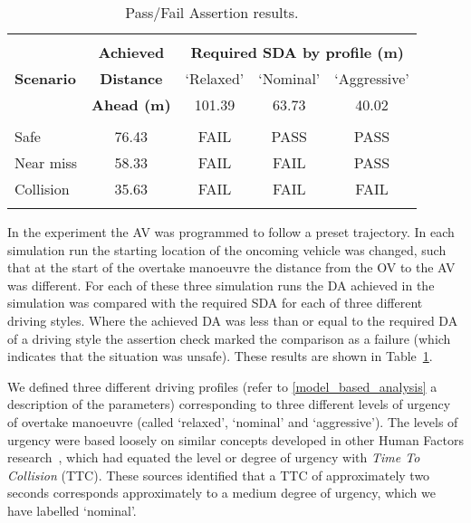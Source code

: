 \begin{table}[t]
\centering
\begin{tabular}{lcccc}
\hline
\\
\multirow{3}{*}{\textbf{Scenario}} & \textbf{Achieved} & \multicolumn{3}{c}{
\textbf{Required SDA by profile (m)}}\\ %
& \textbf{Distance} & `Relaxed' & `Nominal' & `Aggressive' \\
& \textbf{Ahead (m)} & 101.39 & 63.73 & 40.02 \\
\\
%
Safe & 76.43 & FAIL & PASS & PASS\\
%
Near miss & 58.33 & FAIL & FAIL & PASS\\
%
Collision & 35.63 & FAIL & FAIL & FAIL\\
\\
\hline
\end{tabular}
\caption{Pass/Fail Assertion results.} \label{Overtaking_Profiles}
\end{table}

In the experiment the AV was programmed to follow a preset trajectory. In each simulation run the starting location of the oncoming vehicle was changed, such that at the start of the overtake manoeuvre the distance from the OV to the AV was different. For each of these three simulation runs the DA achieved in the simulation was compared with the required SDA for each of three different driving styles. Where the achieved DA was less than or equal to the required DA of a driving style the assertion check marked the comparison as a failure (which indicates that the situation was unsafe). These results are shown in Table~\ref{Overtaking_Profiles}.


We defined three different driving profiles (refer to \ref{model_based_analysis} a description of the parameters) corresponding to three different levels of urgency of overtake manoeuvre (called `relaxed', `nominal' and `aggressive'). %
%
The levels of urgency were based loosely on similar concepts developed in other Human Factors research~\cite{Chen2015,wang2019analysis}, which had equated the level or degree of urgency with \emph{Time To Collision} (TTC). These sources identified that a TTC of approximately two seconds corresponds approximately to a medium degree of urgency, which we have labelled `nominal'. 


